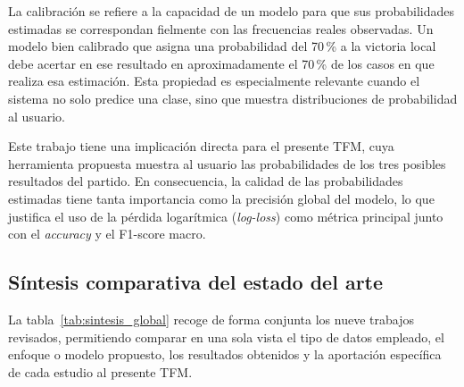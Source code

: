 La calibración se refiere a la capacidad de un modelo para que sus probabilidades estimadas se correspondan fielmente con las frecuencias reales observadas. Un modelo bien calibrado que asigna una probabilidad del 70\,\% a la victoria local debe acertar en ese resultado en aproximadamente el 70\,\% de los casos en que realiza esa estimación. Esta propiedad es especialmente relevante cuando el sistema no solo predice una clase, sino que muestra distribuciones de probabilidad al usuario.

Este trabajo tiene una implicación directa para el presente TFM, cuya herramienta propuesta muestra al usuario las probabilidades de los tres posibles resultados del partido. En consecuencia, la calidad de las probabilidades estimadas tiene tanta importancia como la precisión global del modelo, lo que justifica el uso de la pérdida logarítmica (\textit{log-loss}) como métrica principal junto con el \textit{accuracy} y el F1-score macro.

\subsection{Síntesis comparativa del estado del arte}

La tabla~\ref{tab:sintesis_global} recoge de forma conjunta los nueve trabajos revisados, permitiendo comparar en una sola vista el tipo de datos empleado, el enfoque o modelo propuesto, los resultados obtenidos y la aportación específica de cada estudio al presente TFM.

